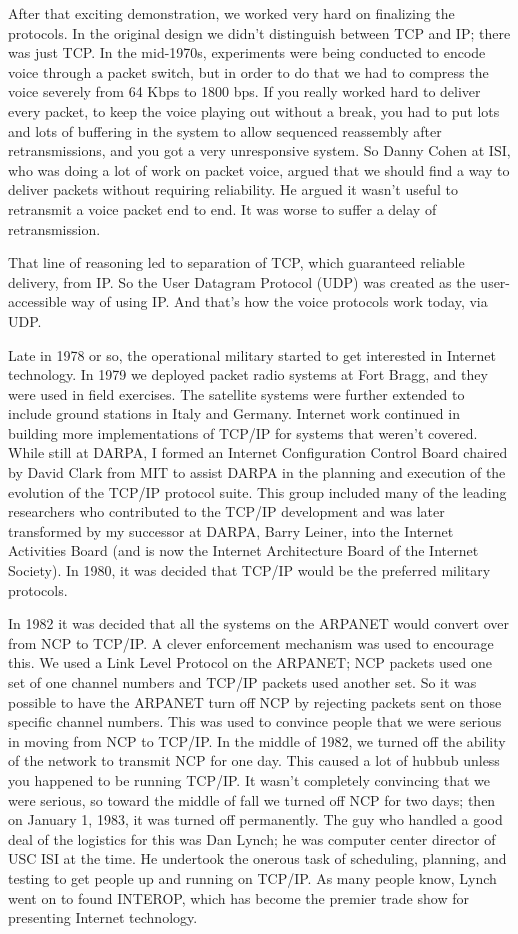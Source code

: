 \documentclass[10pt,a4paper]{scrartcl}
\begin{document}
After that exciting demonstration, we worked very hard on finalizing the protocols. In the original design we didn't distinguish between TCP and IP; there was just TCP. In the mid-1970s, experiments were being conducted to encode voice through a packet switch, but in order to do that we had to compress the voice severely from 64 Kbps to 1800 bps. If you really worked hard to deliver every packet, to keep the voice playing out without a break, you had to put lots and lots of buffering in the system to allow sequenced reassembly after retransmissions, and you got a very unresponsive system. So Danny Cohen at ISI, who was doing a lot of work on packet voice, argued that we should find a way to deliver packets without requiring reliability. He argued it wasn't useful to retransmit a voice packet end to end. It was worse to suffer a delay of retransmission.

That line of reasoning led to separation of TCP, which guaranteed reliable delivery, from IP. So the User Datagram Protocol (UDP) was created as the user-accessible way of using IP. And that's how the voice protocols work today, via UDP.

Late in 1978 or so, the operational military started to get interested in Internet technology. In 1979 we deployed packet radio systems at Fort Bragg, and they were used in field exercises. The satellite systems were further extended to include ground stations in Italy and Germany. Internet work continued in building more implementations of TCP/IP for systems that weren't covered. While still at DARPA, I formed an Internet Configuration Control Board chaired by David Clark from MIT to assist DARPA in the planning and execution of the evolution of the TCP/IP protocol suite. This group included many of the leading researchers who contributed to the TCP/IP development and was later transformed by my successor at DARPA, Barry Leiner, into the Internet Activities Board (and is now the Internet Architecture Board of the Internet Society). In 1980, it was decided that TCP/IP would be the preferred military protocols.

In 1982 it was decided that all the systems on the ARPANET would convert over from NCP to TCP/IP. A clever enforcement mechanism was used to encourage this. We used a Link Level Protocol on the ARPANET; NCP packets used one set of one channel numbers and TCP/IP packets used another set. So it was possible to have the ARPANET turn off NCP by rejecting packets sent on those specific channel numbers. This was used to convince people that we were serious in moving from NCP to TCP/IP. In the middle of 1982, we turned off the ability of the network to transmit NCP for one day. This caused a lot of hubbub unless you happened to be running TCP/IP. It wasn't completely convincing that we were serious, so toward the middle of fall we turned off NCP for two days; then on January 1, 1983, it was turned off permanently. The guy who handled a good deal of the logistics for this was Dan Lynch; he was computer center director of USC ISI at the time. He undertook the onerous task of scheduling, planning, and testing to get people up and running on TCP/IP. As many people know, Lynch went on to found INTEROP, which has become the premier trade show for presenting Internet technology.
\end{document}
